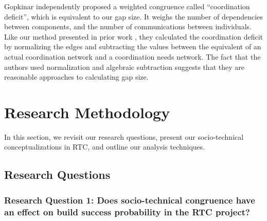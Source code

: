 Gopkinar independently proposed a weighted congruence called ``coordination deficit'', which is equivalent to our gap size. It weighs the number of dependencies between components, and the number of communications between individuals. Like our method presented in prior work \cite{kwan2009:weighted}, they calculated the coordination deficit by normalizing the edges and subtracting the values between the equivalent of an actual coordination network and a coordination needs network. The fact that the authors used normalization and algebraic subtraction suggests that they are reasonable approaches to calculating gap size.



\section{Research Methodology}
\label{sec:methodology}

In this section, we revisit our research questions, present our socio-technical
conceptualizations in RTC, and outline our analysis techniques.

\subsection{Research Questions}



\subsubsection*{Research Question 1: Does socio-technical congruence have an effect on build success probability in the RTC project?}

